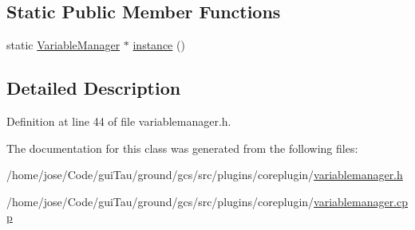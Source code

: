 \subsection*{Static Public Member Functions}
\begin{DoxyCompactItemize}
\item 
static \hyperlink{class_core_1_1_variable_manager}{Variable\-Manager} $\ast$ \hyperlink{group___core_plugin_ga5575bf0907e2289b7960fb10ce13dc95}{instance} ()
\end{DoxyCompactItemize}


\subsection{Detailed Description}


Definition at line 44 of file variablemanager.\-h.



The documentation for this class was generated from the following files\-:\begin{DoxyCompactItemize}
\item 
/home/jose/\-Code/gui\-Tau/ground/gcs/src/plugins/coreplugin/\hyperlink{variablemanager_8h}{variablemanager.\-h}\item 
/home/jose/\-Code/gui\-Tau/ground/gcs/src/plugins/coreplugin/\hyperlink{variablemanager_8cpp}{variablemanager.\-cpp}\end{DoxyCompactItemize}
